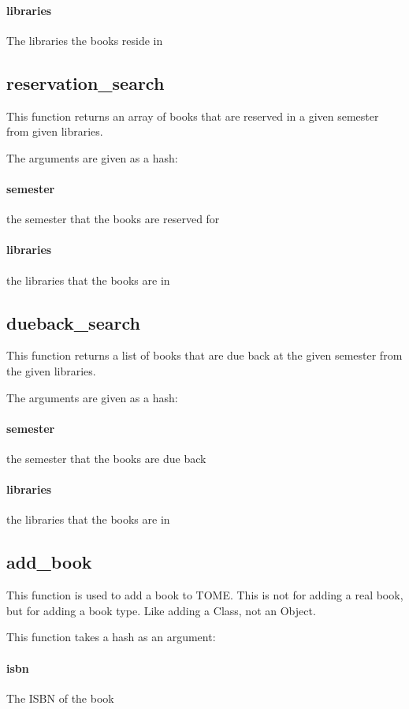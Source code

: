 \documentclass[12pt,titlepage]{article}
\begin{document}
\paragraph{libraries}
The libraries the books reside in

\subsection{reservation\_search}
This function returns an array of books that are reserved in a given semester from given libraries.

The arguments are given as a hash:
\paragraph{semester}
the semester that the books are reserved for 

\paragraph{libraries}
the libraries that the books are in

\subsection{dueback\_search}
This function returns a list of books that are due back at the given semester from the given libraries.

The arguments are given as a hash:
\paragraph{semester}
the semester that the books are due back 

\paragraph{libraries}
the libraries that the books are in

\subsection{add\_book}
This function is used to add a book to TOME. This is not for adding a real book, but for adding a book type. Like adding a Class, not an Object.

This function takes a hash as an argument:
\paragraph{isbn}
The ISBN of the book 
\end{document}
